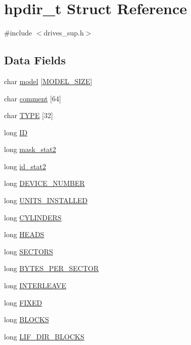\hypertarget{structhpdir__t}{}\section{hpdir\+\_\+t Struct Reference}
\label{structhpdir__t}


{\ttfamily \#include $<$drives\+\_\+sup.\+h$>$}

\subsection*{Data Fields}
\begin{DoxyCompactItemize}
\item 
char \hyperlink{structhpdir__t_a3855aafd93d84611573376653f9cd2c0}{model} \mbox{[}\hyperlink{drives__sup_8h_a3f11d81c1e6d925611a9bdd5115064a0}{M\+O\+D\+E\+L\+\_\+\+S\+I\+ZE}\mbox{]}
\item 
char \hyperlink{structhpdir__t_aa2ba4f9a627c74e84a515e8ac4893bfb}{comment} \mbox{[}64\mbox{]}
\item 
char \hyperlink{structhpdir__t_ad2f925b088d4fd746c9ea789f34f9507}{T\+Y\+PE} \mbox{[}32\mbox{]}
\item 
long \hyperlink{structhpdir__t_aae1a879f64c0ee2dc353d3581e8deec9}{ID}
\item 
long \hyperlink{structhpdir__t_a788d1032b8ff695092f9e4ff4cf36adf}{mask\+\_\+stat2}
\item 
long \hyperlink{structhpdir__t_a1e3ef48d576fa036c6147ec0c5ec3aed}{id\+\_\+stat2}
\item 
long \hyperlink{structhpdir__t_a3e761e4a98a5fdbd789ebf89c50b805f}{D\+E\+V\+I\+C\+E\+\_\+\+N\+U\+M\+B\+ER}
\item 
long \hyperlink{structhpdir__t_a748150d5e0351e2d827f2a4def385ca9}{U\+N\+I\+T\+S\+\_\+\+I\+N\+S\+T\+A\+L\+L\+ED}
\item 
long \hyperlink{structhpdir__t_ac153c658b4e5333b529826d125d40e1e}{C\+Y\+L\+I\+N\+D\+E\+RS}
\item 
long \hyperlink{structhpdir__t_a0b636f508776a07e2aaba4704dc124f2}{H\+E\+A\+DS}
\item 
long \hyperlink{structhpdir__t_a6ee950a83086b3872cfd8fab8d809bf2}{S\+E\+C\+T\+O\+RS}
\item 
long \hyperlink{structhpdir__t_a18355478edba37fb7b2b0bca2448d247}{B\+Y\+T\+E\+S\+\_\+\+P\+E\+R\+\_\+\+S\+E\+C\+T\+OR}
\item 
long \hyperlink{structhpdir__t_ade75ac3fc0b7d605383ca3203ba140bf}{I\+N\+T\+E\+R\+L\+E\+A\+VE}
\item 
long \hyperlink{structhpdir__t_a69855da74bcc15b10039a51e3680a994}{F\+I\+X\+ED}
\item 
long \hyperlink{structhpdir__t_a4b4f32c9b9cfe558ce5fbd51d65b5db3}{B\+L\+O\+C\+KS}
\item 
long \hyperlink{structhpdir__t_a8b6c34460bb1c291860bbb82c56660a4}{L\+I\+F\+\_\+\+D\+I\+R\+\_\+\+B\+L\+O\+C\+KS}
\end{DoxyCompactItemize}



